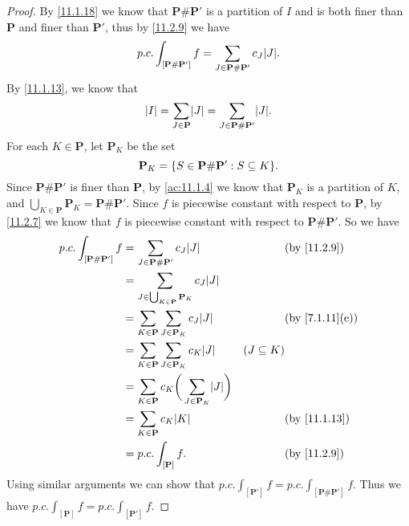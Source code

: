 \begin{proof}
  By \cref{11.1.18} we know that \(\mathbf{P} \# \mathbf{P}'\) is a partition of \(I\) and is both finer than \(\mathbf{P}\) and finer than \(\mathbf{P}'\), thus by \cref{11.2.9} we have
  \[
    p.c. \int_{[\mathbf{P} \# \mathbf{P}']} f = \sum_{J \in \mathbf{P} \# \mathbf{P}'} c_J \abs{J}.
  \]
  By \cref{11.1.13}, we know that
  \[
    \abs{I} = \sum_{J \in \mathbf{P}} \abs{J} = \sum_{J \in \mathbf{P} \# \mathbf{P}'} \abs{J}.
  \]
  For each \(K \in \mathbf{P}\), let \(\mathbf{P}_K\) be the set
  \[
    \mathbf{P}_K = \set{S \in \mathbf{P} \# \mathbf{P}' : S \subseteq K}.
  \]
  Since \(\mathbf{P} \# \mathbf{P}'\) is finer than \(\mathbf{P}\), by \cref{ac:11.1.4} we know that \(\mathbf{P}_K\) is a partition of \(K\), and \(\bigcup_{K \in \mathbf{P}} \mathbf{P}_K = \mathbf{P} \# \mathbf{P}'\).
  Since \(f\) is piecewise constant with respect to \(\mathbf{P}\), by \cref{11.2.7} we know that \(f\) is piecewise constant with respect to \(\mathbf{P} \# \mathbf{P}'\).
  So we have
  \begin{align*}
    p.c. \int_{[\mathbf{P} \# \mathbf{P}']} f & = \sum_{J \in \mathbf{P} \# \mathbf{P}'} c_J \abs{J}                        &                 & \by{11.2.9}                  \\
                                              & = \sum_{J \in \bigcup_{K \in \mathbf{P}} \mathbf{P}_K} c_J \abs{J}                                                           \\
                                              & = \sum_{K \in \mathbf{P}} \sum_{J \in \mathbf{P}_K} c_J \abs{J}             &                 & \text{(by \cref{7.1.11}(e))} \\
                                              & = \sum_{K \in \mathbf{P}} \sum_{J \in \mathbf{P}_K} c_K \abs{J}             & (J \subseteq K)                                \\
                                              & = \sum_{K \in \mathbf{P}} c_K \bigg(\sum_{J \in \mathbf{P}_K} \abs{J}\bigg)                                                  \\
                                              & = \sum_{K \in \mathbf{P}} c_K \abs{K}                                       &                 & \by{11.1.13}                 \\
                                              & = p.c. \int_{[\mathbf{P}]} f.                                               &                 & \by{11.2.9}
  \end{align*}
  Using similar arguments we can show that \(p.c. \int_{[\mathbf{P}']} f = p.c. \int_{[\mathbf{P} \# \mathbf{P}']} f\).
  Thus we have \(p.c. \int_{[\mathbf{P}]} f = p.c. \int_{[\mathbf{P}']} f\).
\end{proof}


